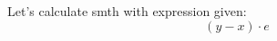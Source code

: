 \documentclass{article}
\begin{document}
Let's calculate smth with expression given:
\[{{({y}-{x})}\cdot{e}}\]
\end{document}
